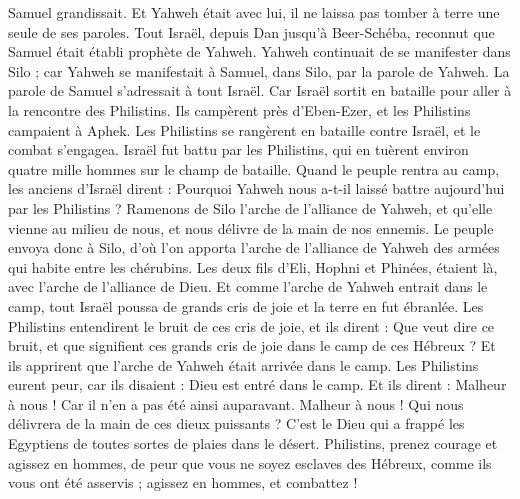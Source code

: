 \begin{multicols}{2}
Samuel grandissait. Et Yahweh était avec lui, il ne laissa pas tomber à terre une seule de ses paroles.
Tout Israël, depuis Dan jusqu'à Beer-Schéba, reconnut que Samuel était établi prophète de Yahweh.
Yahweh continuait de se manifester dans Silo ; car Yahweh se manifestait à Samuel, dans Silo, par la parole de Yahweh.
\VerseOne{}La parole de Samuel s'adressait à tout Israël. Car Israël sortit en bataille pour aller à la rencontre des Philistins. Ils campèrent près d'Eben-Ezer, et les Philistins campaient à Aphek.
Les Philistins se rangèrent en bataille contre Israël, et le combat s'engagea. Israël fut battu par les Philistins, qui en tuèrent environ quatre mille hommes sur le champ de bataille.
Quand le peuple rentra au camp, les anciens d'Israël dirent : Pourquoi Yahweh nous a-t-il laissé battre aujourd'hui par les Philistins ? Ramenons de Silo l'arche de l'alliance de Yahweh, et qu'elle vienne au milieu de nous, et nous délivre de la main de nos ennemis.
Le peuple envoya donc à Silo, d'où l'on apporta l'arche de l'alliance de Yahweh des armées qui habite entre les chérubins. Les deux fils d'Eli, Hophni et Phinées, étaient là, avec l'arche de l'alliance de Dieu.
Et comme l'arche de Yahweh entrait dans le camp, tout Israël poussa de grands cris de joie et la terre en fut ébranlée.
Les Philistins entendirent le bruit de ces cris de joie, et ils dirent : Que veut dire ce bruit, et que signifient ces grands cris de joie dans le camp de ces Hébreux ? Et ils apprirent que l'arche de Yahweh était arrivée dans le camp.
Les Philistins eurent peur, car ils disaient : Dieu est entré dans le camp. Et ils dirent : Malheur à nous ! Car il n'en a pas été ainsi auparavant.
Malheur à nous ! Qui nous délivrera de la main de ces dieux puissants ? C'est le Dieu qui a frappé les Egyptiens de toutes sortes de plaies dans le désert.
Philistins, prenez courage et agissez en hommes, de peur que vous ne soyez esclaves des Hébreux, comme ils vous ont été asservis ; agissez en hommes, et combattez !

\end{multicols}
